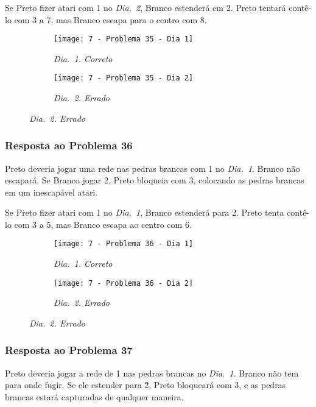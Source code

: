 Se Preto fizer atari com 1 no \emph{Dia.\@~2}, Branco estenderá em 2. Preto tentará contê-lo com 3 a 7, mas Branco escapa para o centro com 8.

\begin{figure}[h!]
    \centering
    \begin{subfigure}[t]{.31\textwidth}
        \texttt{[image: 7 - Problema 35 - Dia 1]}
        \caption*{\emph{Dia.\@~1. Correto}}
    \end{subfigure}
    \hspace{1cm}
    \begin{subfigure}[t]{.31\textwidth}
        \texttt{[image: 7 - Problema 35 - Dia 2]}
        \caption*{\emph{Dia.\@~2. Errado}}
    \end{subfigure}
\end{figure}

\subsubsection*{Resposta ao Problema 36}

Preto deveria jogar uma rede nas pedras brancas com 1 no \emph{Dia.\@~1}. Branco não escapará. Se Branco jogar 2, Preto bloqueia com 3, colocando as pedras brancas em um inescapável atari.
    
Se Preto fizer atari com 1 no \emph{Dia.\@~1}, Branco estenderá para 2. Preto tenta contê-lo com 3 a 5, mas Branco escapa ao centro com 6.

\begin{figure}[h!]
    \centering
    \begin{subfigure}[t]{.31\textwidth}
        \texttt{[image: 7 - Problema 36 - Dia 1]}
        \caption*{\emph{Dia.\@~1. Correto}}
    \end{subfigure}
    \hspace{1cm}
    \begin{subfigure}[t]{.31\textwidth}
        \texttt{[image: 7 - Problema 36 - Dia 2]}
        \caption*{\emph{Dia.\@~2. Errado}}
    \end{subfigure}
\end{figure}

\pagebreak

\subsubsection*{Resposta ao Problema 37}

Preto deveria jogar a rede de 1 nas pedras brancas no \emph{Dia.\@~1}. Branco não tem para onde fugir. Se ele estender para 2, Preto bloqueará com 3, e as pedras brancas estará capturadas de qualquer maneira.
    
